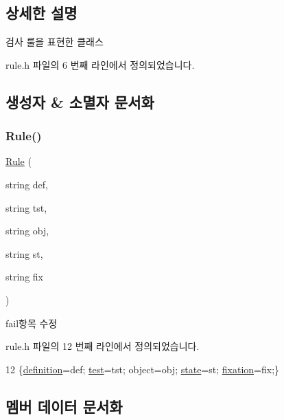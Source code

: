\subsection{상세한 설명}
검사 룰을 표현한 클래스 

rule.\+h 파일의 6 번째 라인에서 정의되었습니다.



\subsection{생성자 \& 소멸자 문서화}
\mbox{\label{struct_rule_af2cf72df5006e2ce8c5a05666b028683}} 
\subsubsection{\texorpdfstring{Rule()}{Rule()}}
{\footnotesize\ttfamily \hyperlink{struct_rule}{Rule} (\begin{DoxyParamCaption}\item[{string}]{def,  }\item[{string}]{tst,  }\item[{string}]{obj,  }\item[{string}]{st,  }\item[{string}]{fix }\end{DoxyParamCaption})\hspace{0.3cm}{\ttfamily [inline]}}

fail항목 수정 

rule.\+h 파일의 12 번째 라인에서 정의되었습니다.


\begin{DoxyCode}
12 \{\hyperlink{struct_rule_a747f1497b7ed37f57b7e005bb01e1b3b}{definition}=def; \hyperlink{struct_rule_a44865cab2ebf41957fd79a0ace31078b}{test}=tst; \textcolor{keywordtype}{object}=obj; \hyperlink{struct_rule_a565f287f7b2370aca4f019d143227c5f}{state}=st; \hyperlink{struct_rule_a580d700e40dd7c70ab0eea2a75335fb7}{fixation}=fix;\}
\end{DoxyCode}


\subsection{멤버 데이터 문서화}
\mbox{\label{struct_rule_a747f1497b7ed37f57b7e005bb01e1b3b}} 
